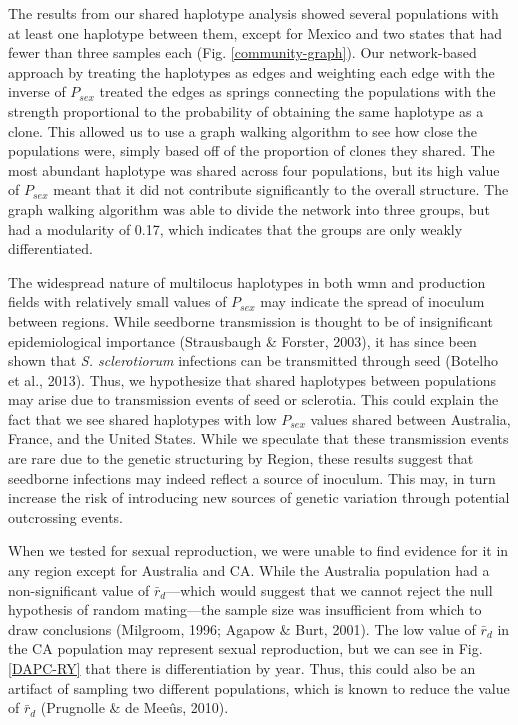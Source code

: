 The results from our shared haplotype analysis showed several
populations with at least one haplotype between them, except for Mexico
and two states that had fewer than three samples each (Fig.
\ref{community-graph}). Our network-based approach by treating the
haplotypes as edges and weighting each edge with the inverse of
\(P_{sex}\) treated the edges as springs connecting the populations with
the strength proportional to the probability of obtaining the same
haplotype as a clone. This allowed us to use a graph walking algorithm
to see how close the populations were, simply based off of the
proportion of clones they shared. The most abundant haplotype was shared
across four populations, but its high value of \(P_{sex}\) meant that it
did not contribute significantly to the overall structure. The graph
walking algorithm was able to divide the network into three groups, but
had a modularity of 0.17, which indicates that the groups are only
weakly differentiated.

The widespread nature of multilocus haplotypes in both wmn and
production fields with relatively small values of \(P_{sex}\) may
indicate the spread of inoculum between regions. While seedborne
transmission is thought to be of insignificant epidemiological
importance (Strausbaugh \& Forster, 2003), it has since been shown that
\emph{S. sclerotiorum} infections can be transmitted through seed
(Botelho et al., 2013). Thus, we hypothesize that shared haplotypes
between populations may arise due to transmission events of seed or
sclerotia. This could explain the fact that we see shared haplotypes
with low \(P_{sex}\) values shared between Australia, France, and the
United States. While we speculate that these transmission events are
rare due to the genetic structuring by Region, these results suggest
that seedborne infections may indeed reflect a source of inoculum. This
may, in turn increase the risk of introducing new sources of genetic
variation through potential outcrossing events.

When we tested for sexual reproduction, we were unable to find evidence
for it in any region except for Australia and CA. While the Australia
population had a non-significant value of \(\bar{r}_d\)---which would
suggest that we cannot reject the null hypothesis of random mating---the
sample size was insufficient from which to draw conclusions (Milgroom,
1996; Agapow \& Burt, 2001). The low value of \(\bar{r}_d\) in the CA
population may represent sexual reproduction, but we can see in Fig.
\ref{DAPC-RY} that there is differentiation by year. Thus, this could
also be an artifact of sampling two different populations, which is
known to reduce the value of \(\bar{r}_d\) (Prugnolle \& de Meeûs,
2010).

